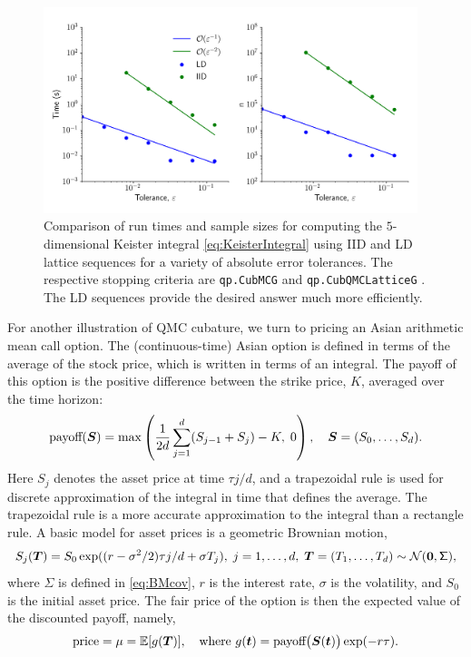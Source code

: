 \documentclass[graybox,footinfo]{svmult}
\newcommand{\mSigma}{\mathsf{\Sigma}}
\begin{document}
\begin{figure}[t]
	\includegraphics[height=6cm]{QMCSoftwareArticle/figs/sc_comp.png}
	\caption{Comparison of run times and sample sizes for computing the $5$-dimensional Keister integral \eqref{eq:KeisterIntegral} using IID and LD lattice sequences for a variety of absolute error tolerances. The respective stopping criteria are  \texttt{qp.CubMCG} \cite{HicEtal14a} and  \texttt{qp.CubQMCLatticeG} \cite{JimHic16a}. The LD sequences provide the desired answer much more efficiently.}
	\label{fig:sc_comp}
\end{figure}

For another illustration of QMC cubature, we turn to pricing an Asian arithmetic mean call option. The (continuous-time) Asian option is defined in terms of the average of the stock price, which is written in terms of an integral. The payoff of this option is the positive difference between the strike price, $K$, averaged over the time horizon: 
$$
\text{payoff}({\boldsymbol{S}}) = \max\left(\frac{1}{2d}\sum_{j=1}^d (S_{j-1}+S_j)-K, \; 0\right), \quad {\boldsymbol{S}} = (S_0, \ldots, S_d).
$$
Here $S_j$ denotes the asset price at time $\tau j/d$, and a trapezoidal rule is used for discrete approximation of the integral in time that defines the average. 
The trapezoidal rule is a more accurate approximation to the integral than a rectangle rule. %
A basic model for asset prices is a geometric Brownian motion, 
\[
S_j(\bsT) = S_0 \exp((r - \sigma^2/2) \tau j/d + \sigma T_j),   \;  j = 1, \ldots, d, \; \bsT = (T_1, \ldots, T_d)\sim \calN(\bszero,\mSigma),
\]
where $\mSigma$ is defined in \eqref{eq:BMcov}, $r$ is the interest rate, $\sigma$ is the volatility, and $S_0$ is the initial asset price.  The fair price of the option is then the expected value of the discounted payoff, namely,
\begin{equation*}
	\text{price} = \mu = {\mathbb{E}}[g({\boldsymbol{T}})], \quad \text{where } g({\boldsymbol{t}}) = \text{payoff}\bigl({\boldsymbol{S}}({\boldsymbol{t}}) \bigr) \exp(-r \tau).
\end{equation*}
\end{document}
